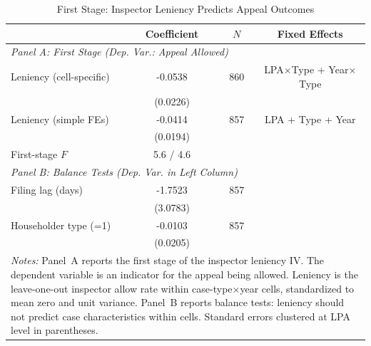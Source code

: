 \begin{table}[t]
\centering
\caption{First Stage: Inspector Leniency Predicts Appeal Outcomes}
\label{tab:first_stage}
\begin{tabular}{lccc}
\hline\hline
 & Coefficient & $N$ & Fixed Effects \\
\hline
\multicolumn{4}{l}{\textit{Panel A: First Stage (Dep. Var.: Appeal Allowed)}} \\[3pt]
Leniency (cell-specific) & -0.0538 & 860 & LPA$\times$Type + Year$\times$Type \\
 & (0.0226) & & \\
Leniency (simple FEs) & -0.0414 & 857 & LPA + Type + Year \\
 & (0.0194) & & \\
First-stage $F$ & 5.6 / 4.6 & & \\[6pt]
\multicolumn{4}{l}{\textit{Panel B: Balance Tests (Dep. Var. in Left Column)}} \\[3pt]
Filing lag (days) & -1.7523 & 857 & \\
 & (3.0783) & & \\
Householder type (=1) & -0.0103 & 857 & \\
 & (0.0205) & & \\
\hline
\multicolumn{4}{p{0.85\textwidth}}{\footnotesize \textit{Notes:} Panel~A reports the first stage of the inspector leniency IV. The dependent variable is an indicator for the appeal being allowed. Leniency is the leave-one-out inspector allow rate within case-type$\times$year cells, standardized to mean zero and unit variance. Panel~B reports balance tests: leniency should not predict case characteristics within cells. Standard errors clustered at LPA level in parentheses.} \\
\end{tabular}
\end{table}
